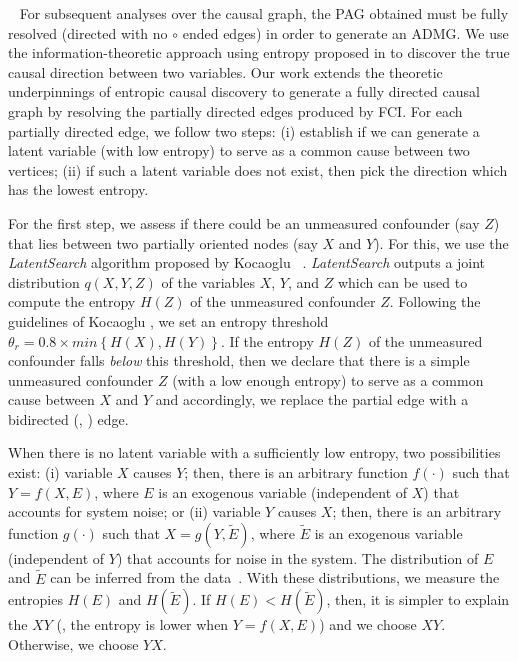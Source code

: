 ~
For subsequent analyses over the causal graph, the PAG obtained must be fully resolved (directed with no $\circ$ ended edges) in order to generate an ADMG. We use the information-theoretic approach using entropy proposed in \cite{Kocaoglu2017,Kocaoglu2020} to discover the true causal direction between two variables. Our work extends the theoretic underpinnings of entropic causal discovery to generate a fully directed causal graph by resolving the partially directed edges produced by FCI. For each partially directed edge, we follow two steps: (i) establish if we can generate a latent variable (with low entropy) to serve as a common cause between two vertices; (ii) if such a latent variable does not exist, then pick the direction which has the lowest entropy. 

For the first step, we assess if there could be an unmeasured confounder (say $Z$) that lies between two partially oriented nodes (say $X$ and $Y$). For this, we use the \textit{LatentSearch} algorithm proposed by Kocaoglu \etal~\cite{Kocaoglu2020}. \textit{LatentSearch} outputs a joint distribution $q(X, Y, Z)$ of the variables $X$, $Y$, and $Z$ which can be used to compute the entropy $H(Z)$ of the unmeasured confounder $Z$. Following the guidelines of Kocaoglu \etal, we set an entropy threshold $\theta_r=0.8 \times min\left\{H(X), H(Y)\right\}$. If the entropy $H(Z)$ of the unmeasured confounder falls \textit{below} this threshold, then we declare that there is a simple unmeasured confounder $Z$ (with a low enough entropy) to serve as a common cause between $X$ and $Y$ and accordingly, we replace the partial edge with a bidirected (\ie, \edgetwo) edge. 

When there is no latent variable with a sufficiently low entropy, two possibilities exist: {(i)} variable $X$ causes $Y$; then, there is an arbitrary function $f(\cdot)$ such that $Y=f(X,E)$, where $E$ is an exogenous variable (independent of $X$) that accounts for system noise; or {(ii)} variable $Y$ causes $X$; then, there is an arbitrary function $g(\cdot)$ such that $X=g(Y,\tilde{E})$, where $\tilde{E}$ is an exogenous variable (independent of $Y$) that accounts for noise in the system. The distribution of $E$ and $\tilde{E}$ can be inferred from the data~\cite[see~\S3.1]{Kocaoglu2017}. With these distributions, we measure the entropies $H(E)$ and $H(\tilde{E})$. If $H(E) < H(\tilde{E})$, then, it is simpler to explain the $X$\edgeone$Y$ (\ie, the entropy is lower when $Y=f(X,E)$) and we choose $X$\edgeone$Y$. Otherwise, we choose $Y$\edgeone$X$. 

